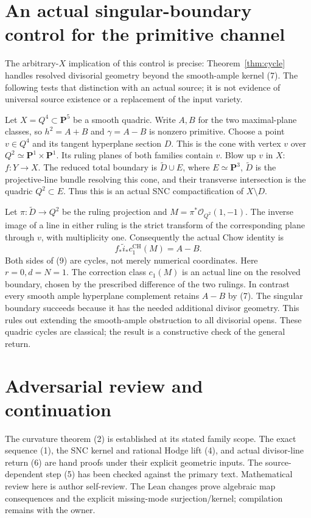 \documentclass[11pt]{article}
\newcommand{\CH}{\operatorname{CH}}
\begin{document}
\section{An actual singular-boundary control for the primitive channel}
The arbitrary-$X$ implication of this control is precise: Theorem~\ref{thm:cycle}
handles resolved divisorial geometry beyond the smooth-ample kernel (7).
The following tests that distinction with an actual source; it is not
evidence of universal source existence or a replacement of the input variety.

Let $X=Q^4\subset\mathbf P^5$ be a smooth quadric. Write $A,B$ for
the two maximal-plane classes, so $h^2=A+B$ and
$\gamma=A-B$ is nonzero primitive. Choose a point $v\in Q^4$ and
its tangent hyperplane section $D$. This is the cone with vertex $v$
over $Q^2\simeq\mathbf P^1\times\mathbf P^1$.
Its ruling planes of both families contain $v$. Blow up $v$ in $X$:
$f:Y\to X$. The reduced total boundary is $\widetilde D\cup E$,
where $E\simeq\mathbf P^3$, $\widetilde D$ is the projective-line
bundle resolving this cone, and their transverse intersection is the
quadric $Q^2\subset E$. Thus this is an actual SNC compactification
of $X\setminus D$.

Let $\pi:\widetilde D\to Q^2$ be the ruling projection and
$M=\pi^*\mathcal O_{Q^2}(1,-1)$. The inverse image of a line in
either ruling is the strict transform of the corresponding plane
through $v$, with multiplicity one. Consequently the actual Chow identity
is
\[
 \boxed{f_*\widetilde i_*c_1^{\CH}(M)=A-B.}             \tag{9}
\]
Both sides of (9) are cycles, not merely numerical coordinates.
Here $r=0,d=N=1$. The correction class $c_1(M)$ is an actual line
on the resolved boundary, chosen by the prescribed difference of
the two rulings. In contrast every smooth ample hyperplane complement
retains $A-B$ by (7). The singular boundary succeeds because it has
the needed additional divisor geometry. This rules out extending the
smooth-ample obstruction to all divisorial opens. These quadric cycles
are classical; the result is a constructive check of the general return.

\section{Adversarial review and continuation}
The curvature theorem (2) is established at its stated family scope.
The exact sequence (1), the SNC kernel and rational Hodge lift (4),
and actual divisor-line return (6) are hand proofs under their explicit
geometric inputs. The source-dependent step (5) has been checked against
the primary text. Mathematical review here is author self-review.
The Lean changes prove algebraic map consequences and the explicit
missing-mode surjection/kernel; compilation remains with the owner.
\end{document}
